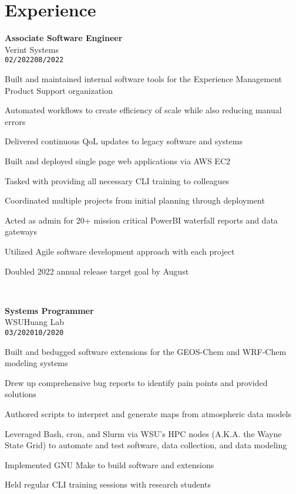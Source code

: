 \documentclass[11pt]{article}
\newenvironment{itemize*}%
  {\begin{itemize}[leftmargin=*,label=\faChevronRight]%
    \setlength{\itemsep}{0pt}%
    \setlength{\parskip}{0pt}%
    \setlength{\parsep}{0pt}}%
  {\end{itemize}}
\newcommand\workexp[5]{
    \hspace*{10pt}
    \begin{minipage}[t]{0.2225\textwidth}
            \raggedleft
                \textbf{\fontsize{14}{10}\selectfont #1}\\ 
                #2\\
                \small\texttt{#3}\textendash \texttt{#4}
    \end{minipage}\hspace*{5pt}%
    \begin{minipage}[t]{0.7\textwidth}
        \raggedright
        \fontsize{10}{10}\selectfont#5
    \end{minipage}
}
\begin{document}
\section*{Experience}
\vspace*{-10pt}\workexp{Associate Software Engineer}{Verint Systems}{02/2022}{08/2022}{%
    \begin{itemize*}
        \item Built and maintained internal software tools for the Experience Management Product Support organization
        \item Automated workflows to create efficiency of scale while also reducing manual errors
        \item Delivered continuous QoL updates to legacy software and systems
        \item Built and deployed single page web applications via AWS EC2
        \item Tasked with providing all necessary CLI training to colleagues
        \item Coordinated multiple projects from initial planning through deployment
        \item Acted as admin for 20+ mission critical PowerBI waterfall reports and data gateways
        \item Utilized Agile software development approach with each project
        \item Doubled 2022 annual release target goal by August
    \end{itemize*}%
}
\vspace*{10pt}\\
\workexp{Systems Programmer}{WSU\textendash Huang Lab}{03/2020}{10/2020}{%
    \begin{itemize*}
        \item Built and bedugged software extensions for the GEOS-Chem and WRF-Chem modeling systems
        \item Drew up comprehensive bug reports to identify pain points and provided solutions
        \item Authored scripts to interpret and generate maps from atmospheric data models
        \item Leveraged Bash, cron, and Slurm via WSU's HPC nodes (A.K.A. the Wayne State Grid) to automate and test software, 
              data collection, and data modeling
        \item Implemented GNU Make to build software and extensions
        \item Held regular CLI training sessions with research students
    \end{itemize*}%
}
\end{document}
